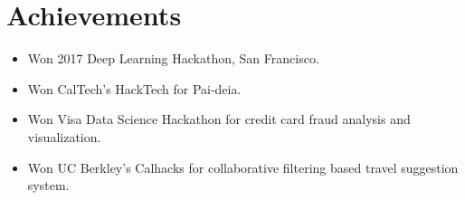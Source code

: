 \newcommand\textlcsc[1]{\textsc{\MakeTextLowercase{#1}}}
\section{Achievements}
\begin{itemize}
\item Won 2017 Deep Learning Hackathon, San Francisco.
\item Won CalTech's HackTech for Pai-deia.
\item Won Visa Data Science Hackathon for credit card fraud analysis and visualization.
\item Won UC Berkley's Calhacks for collaborative filtering based travel suggestion system.
\end{itemize}
